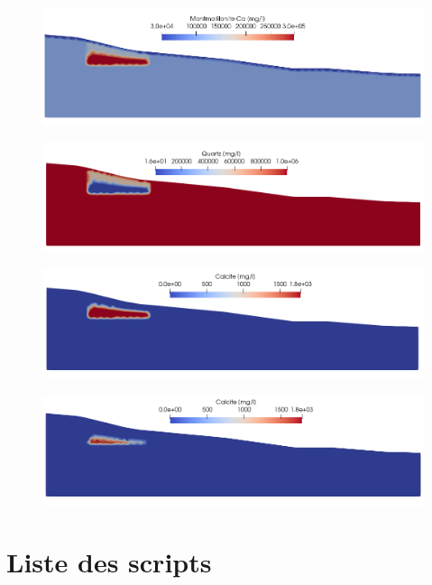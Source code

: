 \documentclass{article}
\makeatletter
\renewcommand\listoffigures{%
    \section{\listfigurename}%
      \@mkboth{\MakeUppercase\listfigurename}%
              {\MakeUppercase\listfigurename}%
    \@starttoc{lof}%
    }
\renewcommand\listoftables{%
    \section{\listtablename}%
      \@mkboth{\MakeUppercase\listtablename}%
              {\MakeUppercase\listtablename}%
    \@starttoc{lot}%
    }
\makeatother
\begin{document}
\begin{figure}[H]
    \centering
    \includegraphics[width=\linewidth]{LJ-Montmorillonite-concentration.PNG}
    \caption{}
    \label{fig:concentration_montmorilonite}
\end{figure}
\newpage
\begin{figure}[H]
    \centering
    \includegraphics[width=\linewidth]{LJ-Quartz-concentration.PNG}
    \caption{}
    \label{fig:concentration_quartz}
\end{figure}
\begin{figure}[H]
    \centering
    \includegraphics[width=\linewidth]{LJ-Calcite-initial-concentration.PNG}
    \caption{}
    \label{fig:concentration_calcite_initial}
\end{figure}

\begin{figure}[H]
    \centering
    \includegraphics[width=\linewidth]{LJ-Calcite-final-concentration.PNG}
    \caption{}
    \label{fig:concentration_calcite_final}
\end{figure}


\newpage
\listoffigures
\newpage
\listoftables
\newpage
\section{Liste des scripts}
\lstlistoflistings
\end{document}
